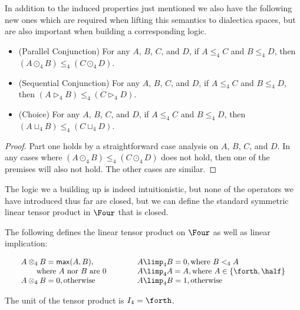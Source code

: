 In addition to the induced properties just mentioned we also have the
following new ones which are required when lifting this semantics to
dialectica spaces, but are also important when building a
corresponding logic.
\begin{lemma}[Functorality]
  \label{lemma:functorality}
  \begin{itemize}
  \item[] (Parallel Conjunction) For any $A$, $B$, $C$, and $D$, if $A \leq_4 C$ and $B \le_4 D$, then
    $(A \odot_4 B) \leq_4 (C \odot_4 D)$.\\[-5px]
  \item[] (Sequential Conjunction) For any $A$, $B$, $C$, and $D$, if $A \leq_4 C$ and $B \le_4 D$, then
  $(A \rhd_4 B) \leq_4 (C \rhd_4 D)$.\\[-5px]
  \item[] (Choice) For any $A$, $B$, $C$, and $D$, if $A \leq_4 C$ and $B \le_4 D$, then
  $(A \sqcup_4 B) \leq_4 (C \sqcup_4 D)$.
  \end{itemize}
\end{lemma}
\begin{proof}
  Part one holds by a straightforward case analysis on $A$, $B$, $C$,
  and $D$.  In any cases where $(A \odot_4 B) \leq_4 (C \odot_4 D)$
  does not hold, then one of the premises will also not hold.  The
  other cases are similar.
\end{proof}
The logic we a building up is indeed intuitionistic, but none of the
operators we have introduced thus far are closed, but we can define
the standard symmetric linear tensor product in $\Four$ that is
closed.
\begin{definition}
  \label{def:tensor-and-implication}
  The following defines the linear tensor product on $\Four$ as well
  as linear implication:  
    \begin{center}
      \begin{math}
        \setlength{\arraycolsep}{10px}
        \begin{array}{lll}
          \begin{array}{lll}
            A \otimes_4 B = \mathsf{max}(A,B), \\
          \,\,\,\,\,\,\,\,\,\,\,\,\text{where $A$ nor $B$ are $0$}\\
          A \otimes_4 B = 0, \text{otherwise}
          \end{array}
          &
          \begin{array}{lll}
          A \limp_4 B = 0, \text{where $B <_4 A$}\\
          A \limp_4 A = A, \text{where $A \in \{\forth,\half\}$}\\
          A \limp_4 B = 1, \text{otherwise}
        \end{array}
        \end{array}
      \end{math}
    \end{center}
    The unit of the tensor product is $I_4 = \forth$.\\   
\end{definition}
